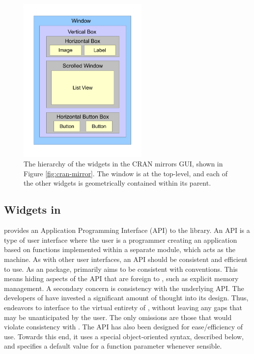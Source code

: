\documentclass[article]{jss}
\begin{document}
\begin{figure}[thp]
\begin{center}
\includegraphics[width=2.5in]{widget-hierarchy.pdf}
\caption{\label{fig:widget-hierarchy}The hierarchy of the widgets in the CRAN
mirrors GUI, shown in Figure \ref{fig:cran-mirror}. The window is at the top-level,
and each of the other widgets is geometrically contained within its parent.}
\end{center}
\end{figure}

\subsection[GTK+ Widgets in R]{ Widgets in }

 provides an Application Programming Interface (API) to the  
library. An API is a type of user interface where the user
is a programmer creating an application based on functions implemented within a 
separate module, which acts as the machine. 
As with other user interfaces,
an API should be consistent and efficient to use. As an  package,
 primarily aims to be consistent with  conventions. This
means hiding aspects of the  API that are foreign to ,
such as explicit memory management. A secondary concern is consistency 
with the underlying  API. The developers of
 have invested a significant amount of thought into its design. Thus,
 endeavors to interface  to the virtual entirety of ,
without leaving any gaps that may be unanticipated by the user. 
The only omissions are those that would violate consistency with
.
The  API has also been designed for ease/efficiency of use. Towards this end,
it uses a special object-oriented syntax, described below, and specifies
a default value for a function parameter whenever sensible.
\end{document}
